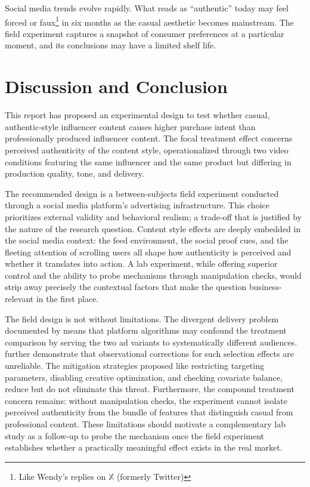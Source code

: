 \documentclass[10pt]{article}
\begin{document}
Social media trends evolve rapidly. What reads as ``authentic'' today may feel forced or faux\footnote{Like Wendy's replies on $\mathbb{X}$ (formerly Twitter)} in six months as the casual aesthetic becomes mainstream. The field experiment captures a snapshot of consumer preferences at a particular moment, and its conclusions may have a limited shelf life.

\section{Discussion and Conclusion}

This report has proposed an experimental design to test whether casual, authentic-style influencer content causes higher purchase intent than professionally produced influencer content. The focal treatment effect concerns perceived authenticity of the content style, operationalized through two video conditions featuring the same influencer and the same product but differing in production quality, tone, and delivery.

The recommended design is a between-subjects field experiment conducted through a social media platform's advertising infrastructure. This choice prioritizes external validity and behavioral realism; a trade-off that is justified by the nature of the research question. Content style effects are deeply embedded in the social media context: the feed environment, the social proof cues, and the fleeting attention of scrolling users all shape how authenticity is perceived and whether it translates into action. A lab experiment, while offering superior control and the ability to probe mechanisms through manipulation checks, would strip away precisely the contextual factors that make the question business-relevant in the first place.

The field design is not without limitations. The divergent delivery problem documented by \cite{braun2020} means that platform algorithms may confound the treatment comparison by serving the two ad variants to systematically different audiences. \cite{gordon2019} further demonstrate that observational corrections for such selection effects are unreliable. The mitigation strategies proposed like restricting targeting parameters, disabling creative optimization, and checking covariate balance, reduce but do not eliminate this threat. Furthermore, the compound treatment concern remains: without manipulation checks, the experiment cannot isolate perceived authenticity from the bundle of features that distinguish casual from professional content. These limitations should motivate a complementary lab study as a follow-up to probe the mechanism once the field experiment establishes whether a practically meaningful effect exists in the real market.
\end{document}
